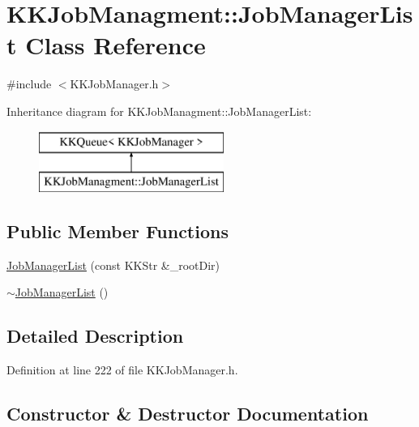 \hypertarget{class_k_k_job_managment_1_1_job_manager_list}{}\section{K\+K\+Job\+Managment\+:\+:Job\+Manager\+List Class Reference}
\label{class_k_k_job_managment_1_1_job_manager_list}


{\ttfamily \#include $<$K\+K\+Job\+Manager.\+h$>$}

Inheritance diagram for K\+K\+Job\+Managment\+:\+:Job\+Manager\+List\+:\begin{figure}[H]
\begin{center}
\leavevmode
\includegraphics[height=2.000000cm]{class_k_k_job_managment_1_1_job_manager_list}
\end{center}
\end{figure}
\subsection*{Public Member Functions}
\begin{DoxyCompactItemize}
\item 
\hyperlink{class_k_k_job_managment_1_1_job_manager_list_aed59e41b5d45996577a2380173a2dec0}{Job\+Manager\+List} (const K\+K\+Str \&\+\_\+root\+Dir)
\item 
\hyperlink{class_k_k_job_managment_1_1_job_manager_list_a7056b7da62f92091208d4e72499e21a4}{$\sim$\+Job\+Manager\+List} ()
\end{DoxyCompactItemize}


\subsection{Detailed Description}


Definition at line 222 of file K\+K\+Job\+Manager.\+h.



\subsection{Constructor \& Destructor Documentation}

